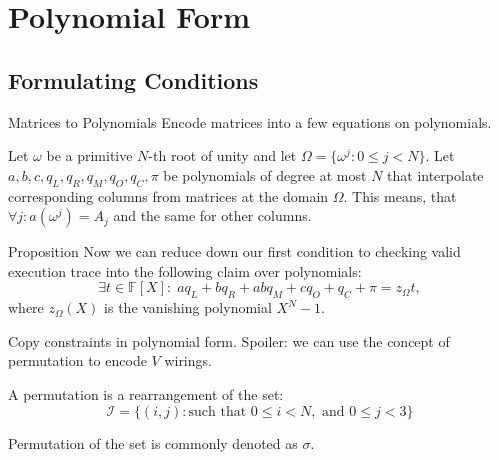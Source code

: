 \documentclass{zkdl-presentation-template}
\begin{document}
    \section{Polynomial Form}
    \subsection{Formulating Conditions}
    \begin{frame}{Matrices to Polynomials}
        Encode matrices into a few equations on polynomials. 

        Let $\omega$ be a primitive $N$-th root of unity and let $\Omega = \{\omega^j: 0 \le j < N\}$. 
        Let \(a, b, c, q_L, q_R, q_M, q_O, q_C, \pi\) be polynomials of degree at most $N$ that
        interpolate corresponding columns from matrices at the domain $\Omega$. This means,
        that \(\forall j: a(\omega^j) = A_j\) and the same for other columns.

        \pause\begin{block}{Proposition}
            Now we can reduce down our first condition to checking valid execution trace
            into the following claim over polynomials:
            \[\exists t \in \mathbb{F}[X]: \; aq_L + bq_R + abq_M + cq_O + q_C + \pi = z_{\Omega} t,\]
            where $z_{\Omega}(X)$ is the vanishing polynomial $X^N - 1$.
        \end{block}
    \end{frame}

    \begin{frame} {Copy constraints in polynomial form.}
        Spoiler: we can use the concept of permutation to encode $V$ wirings.
    
        A permutation is a rearrangement of the set: 
        \[\mathcal{I} = \{(i, j) : \text{such that } 0 \leq i < N, \text{ and } 0 \leq j < 3\}\]

        Permutation of the set is commonly denoted as $\sigma$.
    \end{frame}
\end{document}
